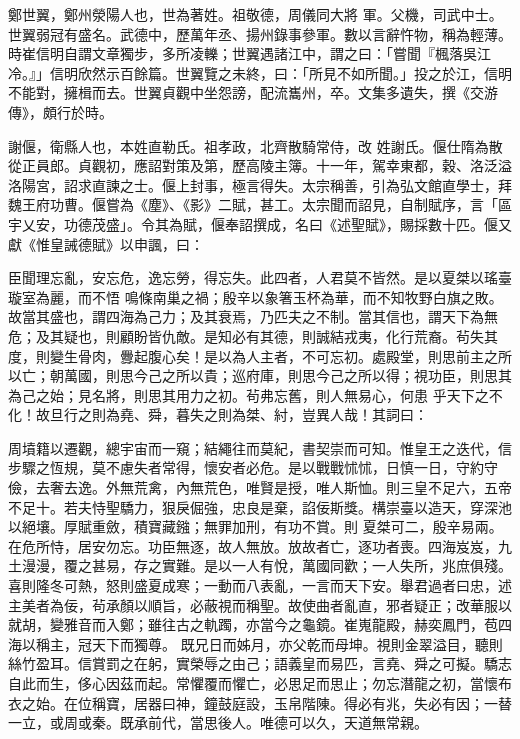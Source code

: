 \begin{pinyinscope}
 鄭世翼，鄭州滎陽人也，世為著姓。祖敬德，周儀同大將
 軍。父機，司武中士。世翼弱冠有盛名。武德中，歷萬年丞、揚州錄事參軍。數以言辭忤物，稱為輕薄。時崔信明自謂文章獨步，多所凌轢；世翼遇諸江中，謂之曰：「嘗聞『楓落吳江冷。』」信明欣然示百餘篇。世翼覽之未終，曰：「所見不如所聞。」投之於江，信明不能對，擁楫而去。世翼貞觀中坐怨謗，配流巂州，卒。文集多遺失，撰《交游傳》，頗行於時。



 謝偃，衛縣人也，本姓直勒氏。祖孝政，北齊散騎常侍，改
 姓謝氏。偃仕隋為散從正員郎。貞觀初，應詔對策及第，歷高陵主簿。十一年，駕幸東都，穀、洛泛溢洛陽宮，詔求直諫之士。偃上封事，極言得失。太宗稱善，引為弘文館直學士，拜魏王府功曹。偃嘗為《塵》、《影》二賦，甚工。太宗聞而詔見，自制賦序，言「區宇乂安，功德茂盛」。令其為賦，偃奉詔撰成，名曰《述聖賦》，賜採數十匹。偃又獻《惟皇誡德賦》以申諷，曰：



 臣聞理忘亂，安忘危，逸忘勞，得忘失。此四者，人君莫不皆然。是以夏桀以瑤臺璇室為麗，而不悟
 鳴條南巢之禍；殷辛以象箸玉杯為華，而不知牧野白旗之敗。故當其盛也，謂四海為己力；及其衰焉，乃匹夫之不制。當其信也，謂天下為無危；及其疑也，則顧盼皆仇敵。是知必有其德，則誠結戎夷，化行荒裔。茍失其度，則變生骨肉，釁起腹心矣！是以為人主者，不可忘初。處殿堂，則思前主之所以亡；朝萬國，則思今己之所以貴；巡府庫，則思今己之所以得；視功臣，則思其為己之始；見名將，則思其用力之初。茍弗忘舊，則人無易心，何患
 乎天下之不化！故旦行之則為堯、舜，暮失之則為桀、紂，豈異人哉！其詞曰：



 周墳籍以遷觀，總宇宙而一窺；結繩往而莫紀，書契崇而可知。惟皇王之迭代，信步驟之恆規，莫不慮失者常得，懷安者必危。是以戰戰怵怵，日慎一日，守約守儉，去奢去逸。外無荒禽，內無荒色，唯賢是授，唯人斯恤。則三皇不足六，五帝不足十。若夫恃聖驕力，狠戾倔強，忠良是棄，諂佞斯獎。構崇臺以造天，穿深池以絕壤。厚賦重斂，積寶藏鏹；無罪加刑，有功不賞。則
 夏桀可二，殷辛易兩。在危所恃，居安勿忘。功臣無逐，故人無放。放故者亡，逐功者喪。四海岌岌，九土漫漫，覆之甚易，存之實難。是以一人有悅，萬國同歡；一人失所，兆庶俱殘。喜則隆冬可熱，怒則盛夏成寒；一動而八表亂，一言而天下安。舉君過者曰忠，述主美者為佞，茍承顏以順旨，必蔽視而稱聖。故使曲者亂直，邪者疑正；改華服以就胡，變雅音而入鄭；雖往古之軌躅，亦當今之龜鏡。崔嵬龍殿，赫奕鳳門，苞四海以稱主，冠天下而獨尊。
 既兄日而姊月，亦父乾而母坤。視則金翠溢目，聽則絲竹盈耳。信賞罰之在躬，實榮辱之由己；語義皇而易匹，言堯、舜之可擬。驕志自此而生，侈心因茲而起。常懼覆而懼亡，必思足而思止；勿忘潛龍之初，當懷布衣之始。在位稱寶，居器曰神，鐘鼓庭設，玉帛階陳。得必有兆，失必有因；一替一立，或周或秦。既承前代，當思後人。唯德可以久，天道無常親。




\end{pinyinscope}
